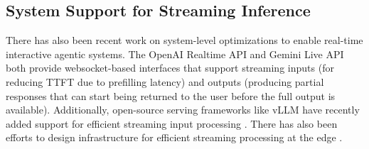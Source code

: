 \subsection{System Support for Streaming Inference}

There has also been recent work on system-level optimizations to enable real-time interactive agentic systems.
The OpenAI Realtime API \citep{openai_realtime_api} and Gemini Live API \citep{GoogleLiveAPI2025} both provide websocket-based interfaces that support streaming inputs (for reducing TTFT due to prefilling latency) and outputs (producing partial responses that can start being returned to the user before the full output is available).
Additionally, open-source serving frameworks like vLLM have recently added support for efficient streaming input processing \citep{vllm2026streaming}.
There has also been efforts to design infrastructure for efficient streaming processing at the edge \citep{jeffries2024moonshine}.
